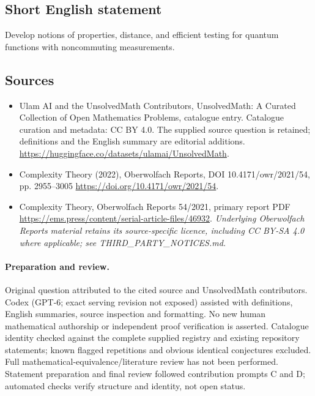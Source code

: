 \documentclass[11pt]{article}
\begin{document}
\subsection{Short English statement}
Develop notions of properties, distance, and efficient testing for quantum functions with noncommuting measurements.
\subsection{Sources}
\begin{itemize}
\item[\hypertarget{source:statement:1}{S1}] Ulam AI and the UnsolvedMath Contributors, UnsolvedMath: A Curated Collection of Open Mathematics Problems, catalogue entry. Catalogue curation and metadata: CC BY 4.0. The supplied source question is retained; definitions and the English summary are editorial additions.
\url{https://huggingface.co/datasets/ulamai/UnsolvedMath}.
\item[\hypertarget{source:statement:2}{S2}] Complexity Theory (2022), Oberwolfach Reports, DOI 10.4171/owr/2021/54, pp. 2955--3005
\url{https://doi.org/10.4171/owr/2021/54}.
\item[\hypertarget{source:statement:3}{S3}] Complexity Theory, Oberwolfach Reports 54/2021, primary report PDF
\url{https://ems.press/content/serial-article-files/46932}.
\textit{Underlying Oberwolfach Reports material retains its source-specific licence, including CC BY-SA 4.0 where applicable; see THIRD\_PARTY\_NOTICES.md.}
\end{itemize}
\paragraph{Preparation and review.}
Original question attributed to the cited source and UnsolvedMath contributors. Codex (GPT-6; exact serving revision not exposed) assisted with definitions, English summaries, source inspection and formatting. No new human mathematical authorship or independent proof verification is asserted. Catalogue identity checked against the complete supplied registry and existing repository statements; known flagged repetitions and obvious identical conjectures excluded. Full mathematical-equivalence/literature review has not been performed. Statement preparation and final review followed contribution prompts C and D; automated checks verify structure and identity, not open status.
\label{end:statement}
\end{document}
